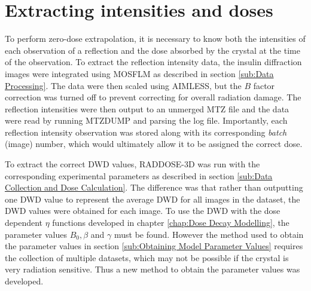 \section{Extracting intensities and doses}
\label{sec:Extracting Intensities and Doses}
To perform zero-dose extrapolation, it is necessary to know both the intensities of each observation of a reflection and the dose absorbed by the crystal at the time of the observation.
To extract the reflection intensity data, the insulin diffraction images were integrated using MOSFLM as described in section \ref{sub:Data Processing}.
The data were then scaled using AIMLESS, but the $B$ factor correction was turned off to prevent correcting for overall radiation damage.
The reflection intensities were then output to an unmerged MTZ file and the data were read by running MTZDUMP and parsing the log file.
Importantly, each reflection intensity observation was stored along with its corresponding \textit{batch} (image) number, which would ultimately allow it to be assigned the correct dose.

To extract the correct DWD values, RADDOSE-3D was run with the corresponding experimental parameters as described in section \ref{sub:Data Collection and Dose Calculation}.
The difference was that rather than outputting one DWD value to represent the average DWD for all images in the dataset, the DWD values were obtained for each image.
To use the DWD with the dose dependent $\eta$ functions developed in chapter \ref{chap:Dose Decay Modelling}, the parameter values $B_0, \beta$ and $\gamma$ must be found.
However the method used to obtain the parameter values in section \ref{sub:Obtaining Model Parameter Values} requires the collection of multiple datasets, which may not be possible if the crystal is very radiation sensitive.
Thus a new method to obtain the parameter values was developed.


